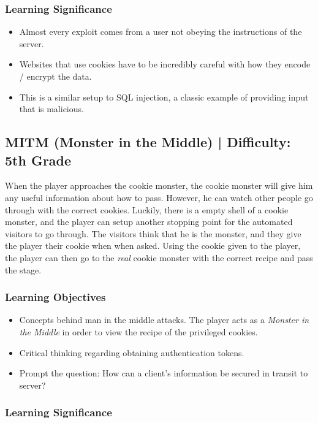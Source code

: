 \documentclass{article}
\begin{document}
\subsubsection{Learning Significance}

\begin{itemize}
  \item Almost every exploit comes from a user not obeying the
    instructions of the server.
  \item Websites that use cookies have to be incredibly careful with
    how they encode / encrypt the data.
  \item This is a similar setup to SQL injection, a classic example of
    providing input that is malicious.
\end{itemize}

\subsection{MITM (Monster in the Middle) | Difficulty: 5th Grade}

When the player approaches the cookie monster, the cookie monster will
give him any useful information about how to pass. However, he can watch
other people go through with the correct cookies. Luckily, there is a
empty shell of a cookie monster, and the player can setup another
stopping point for the automated visitors to go through. The visitors
think that he is the monster, and they give the player their cookie when
when asked. Using the cookie given to the player, the player can then go to the
\textit{real} cookie monster with the correct recipe and pass the
stage.

\subsubsection{Learning Objectives}

\begin{itemize}
  \item Concepts behind man in the middle attacks. The player acts as a
  \textit{Monster in the Middle} in order to view the recipe of the privileged cookies.
  \item Critical thinking regarding obtaining authentication tokens.
  \item Prompt the question: How can a client's information be secured in transit to server?
\end{itemize}

\subsubsection{Learning Significance}
\end{document}
